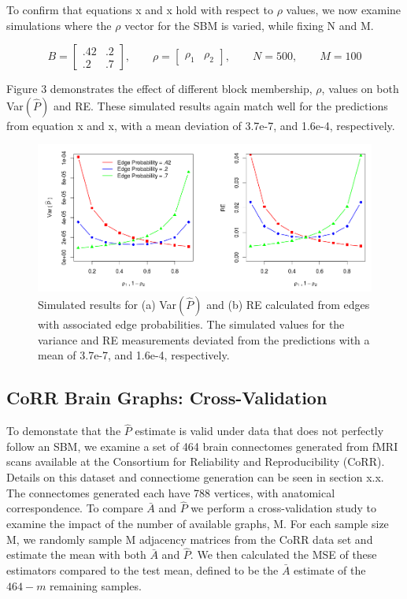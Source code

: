 To confirm that equations x and x hold with respect to $\rho$ values, we now examine simulations where the $\rho$ vector for the SBM  is varied, while fixing N and M.

\begin{equation*}
B = \begin{bmatrix}
.42 & .2 \\
.2 & .7 
\end{bmatrix}
,\qquad \rho = \begin{bmatrix}
\rho_1 & \rho_2
\end{bmatrix}
,\qquad N = 500,\qquad M = 100
\end{equation*}

Figure 3 demonstrates the effect of different block membership, $\rho$, values on both Var$(\hat{P})$ and RE.  These simulated results again match well for the predictions from equation x and x, with a mean deviation of 3.7e-7, and 1.6e-4, respectively.
\begin{figure}[!htb]
	\centering
	\includegraphics[width=16cm]{VarRE.PNG}
	\caption{Simulated results for (a) Var$(\hat{P})$ and (b) RE calculated from edges with associated edge probabilities. The simulated values for the variance and RE measurements deviated from the predictions with a mean of 3.7e-7, and 1.6e-4, respectively.}
	\label{fig:plot1}
\end{figure}
\subsection{CoRR Brain Graphs: Cross-Validation}
	
	To demonstate that the $\hat{P}$ estimate is valid under data that does not perfectly follow an SBM, we examine a set of 464 brain connectomes generated from fMRI scans available at the Consortium for Reliability and Reproducibility (CoRR).  Details on this dataset and connectiome generation can be seen in section x.x.  The connectomes generated each have 788 vertices, with anatomical correspondence. To compare $\bar{A}$ and $\hat{P}$ we perform a cross-validation study to examine the impact of the number of available graphs, M.  For each sample size M, we randomly sample M adjacency matrices from the CoRR data set and estimate the mean with both $\bar{A}$ and $\hat{P}$.  We then calculated the MSE of these estimators compared to the test mean, defined to be the $\bar{A}$ estimate of the $464-m$ remaining samples. 
	
